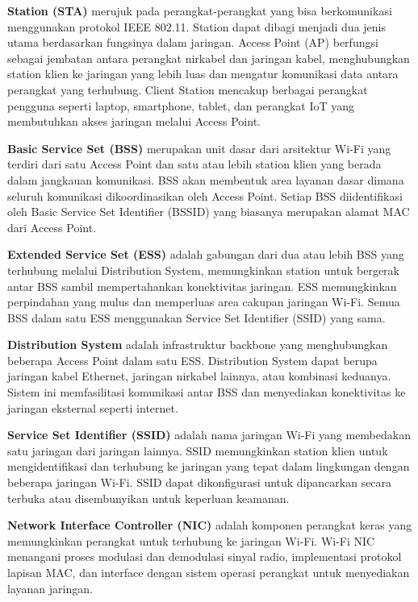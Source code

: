 \textbf{Station (STA)} merujuk pada perangkat-perangkat yang bisa berkomunikasi menggunakan protokol IEEE 802.11. Station dapat dibagi menjadi dua jenis utama berdasarkan fungsinya dalam jaringan. Access Point (AP) berfungsi sebagai jembatan antara perangkat nirkabel dan jaringan kabel, menghubungkan station klien ke jaringan yang lebih luas dan mengatur komunikasi data antara perangkat yang terhubung. Client Station mencakup berbagai perangkat pengguna seperti laptop, smartphone, tablet, dan perangkat IoT yang membutuhkan akses jaringan melalui Access Point.

\textbf{Basic Service Set (BSS)} merupakan unit dasar dari arsitektur Wi-Fi yang terdiri dari satu Access Point dan satu atau lebih station klien yang berada dalam jangkauan komunikasi. BSS akan membentuk area layanan dasar dimana seluruh komunikasi dikoordinasikan oleh Access Point. Setiap BSS diidentifikasi oleh Basic Service Set Identifier (BSSID) yang biasanya merupakan alamat MAC dari Access Point.

\textbf{Extended Service Set (ESS)} adalah gabungan dari dua atau lebih BSS yang terhubung melalui Distribution System, memungkinkan station untuk bergerak antar BSS sambil mempertahankan konektivitas jaringan. ESS memungkinkan perpindahan yang mulus dan memperluas area cakupan jaringan Wi-Fi. Semua BSS dalam satu ESS menggunakan Service Set Identifier (SSID) yang sama.

\textbf{Distribution System} adalah infrastruktur backbone yang menghubungkan beberapa Access Point dalam satu ESS. Distribution System dapat berupa jaringan kabel Ethernet, jaringan nirkabel lainnya, atau kombinasi keduanya. Sistem ini memfasilitasi komunikasi antar BSS dan menyediakan konektivitas ke jaringan eksternal seperti internet.

\textbf{Service Set Identifier (SSID)} adalah nama jaringan Wi-Fi yang membedakan satu jaringan dari jaringan lainnya. SSID memungkinkan station klien untuk mengidentifikasi dan terhubung ke jaringan yang tepat dalam lingkungan dengan beberapa jaringan Wi-Fi. SSID dapat dikonfigurasi untuk dipancarkan secara terbuka atau disembunyikan untuk keperluan keamanan.

\textbf{Network Interface Controller (NIC)} adalah komponen perangkat keras yang memungkinkan perangkat untuk terhubung ke jaringan Wi-Fi. Wi-Fi NIC menangani proses modulasi dan demodulasi sinyal radio, implementasi protokol lapisan MAC, dan interface dengan sistem operasi perangkat untuk menyediakan layanan jaringan.

